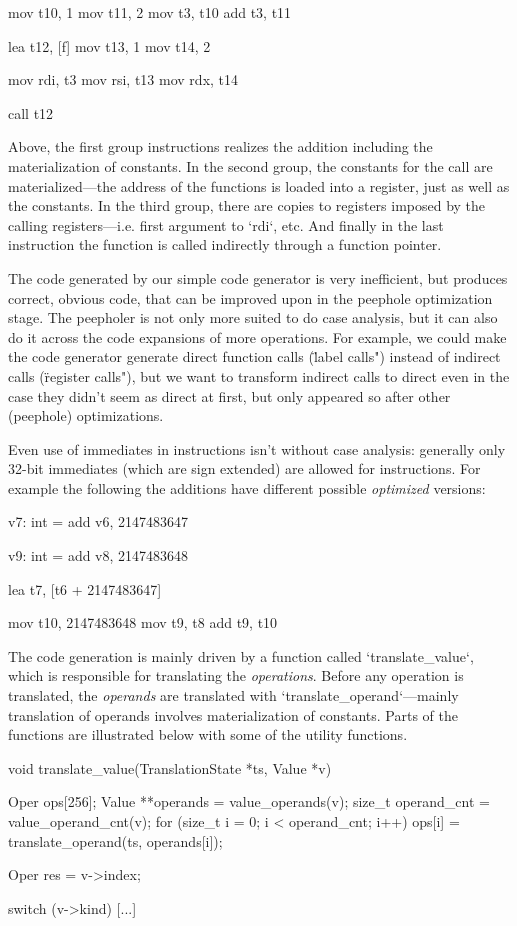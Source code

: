 \begtt
mov t10, 1
mov t11, 2
mov t3, t10
add t3, t11

lea t12, [f]
mov t13, 1
mov t14, 2

mov rdi, t3
mov rsi, t13
mov rdx, t14

call t12
\endtt

Above, the first group instructions realizes the addition including the
materialization of constants. In the second group, the constants for the call
are materialized---the address of the functions is loaded into a register, just
as well as the constants. In the third group, there are copies to registers imposed by the
calling registers---i.e. first argument to `rdi`, etc. And finally in the last
instruction the function is called indirectly through a function pointer.

The code generated by our simple code generator is very inefficient, but
produces correct, obvious code, that can be improved upon in the peephole
optimization stage. The peepholer is not only more suited to do case analysis,
but it can also do it across the code expansions of more operations. For
example, we could make the code generator generate direct function calls
(\"label calls") instead of indirect calls (\"register calls"), but we want to
transform indirect calls to direct even in the case they didn't seem as direct
at first, but only appeared so after other (peephole) optimizations.

Even use of immediates in instructions isn't without case analysis: generally
only 32-bit immediates (which are sign extended) are allowed for instructions.
For example the following the additions have different possible {\em optimized}
versions:

\begtt
v7: int = add v6, 2147483647

v9: int = add v8, 2147483648
\endtt

\begtt
lea t7, [t6 + 2147483647]

mov t10, 2147483648
mov t9, t8
add t9, t10
\endtt

The code generation is mainly driven by a function called `translate_value`,
which is responsible for translating the {\em operations}. Before any operation
is translated, the {\em operands} are translated with
`translate_operand`---mainly translation of operands involves materialization of
constants. Parts of the functions are illustrated below with some of the utility
functions.

\begtt
void translate_value(TranslationState *ts, Value *v) {
	Oper ops[256];
	Value **operands = value_operands(v);
	size_t operand_cnt = value_operand_cnt(v);
	for (size_t i = 0; i < operand_cnt; i++)
		ops[i] = translate_operand(ts, operands[i]);

	Oper res = v->index;

	switch (v->kind) {
		[...]
	}
}
\endtt

